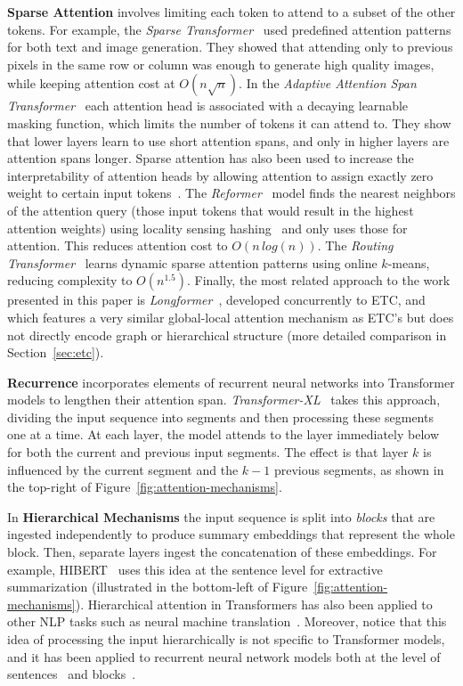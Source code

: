 \documentclass[11pt,a4paper]{article}
\begin{document}
{\bf Sparse Attention} involves limiting each token to attend to a subset of the other tokens. For example, the {\em Sparse Transformer}~\cite{child2019generating} used predefined attention patterns for both text and image generation. They showed that attending only to previous pixels in the same row or column was enough to generate high quality images, while keeping attention cost at $O(n\sqrt{n})$. In the {\em Adaptive Attention Span Transformer}~\cite{sukhbaatar2019adaptive} each attention head is associated with a decaying learnable masking function, which limits the number of tokens it can attend to. They show that lower layers learn to use short attention spans, and only in higher layers are attention spans longer. Sparse attention has also been used to increase the interpretability of attention heads by allowing attention to assign exactly zero weight to certain input tokens~\cite{correia2019adaptively}. The {\em Reformer}~\cite{kitaev2020reformer} model finds the nearest neighbors of the attention query (those input tokens that would result in the highest attention weights) using locality sensing hashing~\cite{andoni2015practical} and only uses those for attention. This reduces attention cost to $O(n \,  \mathit{log}(n))$. The {\em Routing Transformer}~\cite{roy2020efficient} learns dynamic sparse attention patterns using online $k$-means, reducing complexity to $O(n^{1.5})$. Finally, the most related approach to the work presented in this paper is {\em Longformer}~\cite{beltagy2020longformer}, developed concurrently to ETC, and which features a very similar global-local attention mechanism as ETC's but does not directly encode graph or hierarchical structure (more detailed comparison in Section~\ref{sec:etc}).


{\bf Recurrence} incorporates elements of recurrent neural networks into Transformer models to lengthen their attention span. {\em Transformer-XL}~\cite{dai2019transformer} takes this approach, dividing the input sequence into segments and then processing these segments one at a time. At each layer, the model attends to the layer immediately below for both the current and previous input segments. The effect is that layer $k$ is influenced by the current segment and the $k-1$ previous segments, as shown in the top-right of Figure~\ref{fig:attention-mechanisms}.


In {\bf Hierarchical Mechanisms} the input sequence is split into {\em blocks} that are ingested independently to produce summary embeddings that represent the whole block. Then, separate layers ingest the concatenation of these embeddings. For example, HIBERT~\cite{zhang2019hibert} uses this idea at the sentence level for extractive summarization (illustrated in the bottom-left of Figure~\ref{fig:attention-mechanisms}). Hierarchical attention in Transformers has also been applied to other NLP tasks such as neural machine translation~\cite{maruf2019selective}. Moreover, notice that this idea of processing the input hierarchically is not specific to Transformer models, and it has been applied to recurrent neural network models both at the level of sentences~\cite{yang2016hierarchical,miculicich2018document} and blocks~\cite{shen2018bi}. 
\end{document}
